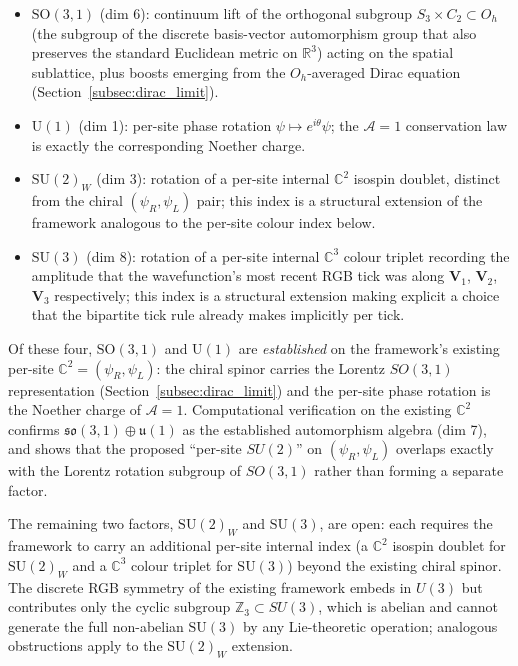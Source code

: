\begin{itemize}
\item $\mathrm{SO}(3,1)$ (dim 6): continuum lift of the orthogonal
subgroup $S_3 \times C_2 \subset O_h$ (the subgroup of the discrete
basis-vector automorphism group that also preserves the standard
Euclidean metric on $\mathbb{R}^3$) acting on the spatial sublattice,
plus boosts emerging from the $O_h$-averaged Dirac equation
(Section~\ref{subsec:dirac_limit}).
\item $\mathrm{U}(1)$ (dim 1): per-site phase rotation $\psi \mapsto
e^{i\theta}\psi$; the $\mathcal{A}=1$ conservation law is exactly the
corresponding Noether charge.
\item $\mathrm{SU}(2)_W$ (dim 3): rotation of a per-site internal
$\mathbb{C}^2$ isospin doublet, distinct from the chiral $(\psi_R,
\psi_L)$ pair; this index is a structural extension of the framework
analogous to the per-site colour index below.
\item $\mathrm{SU}(3)$ (dim 8): rotation of a per-site internal
$\mathbb{C}^3$ colour triplet recording the amplitude that the
wavefunction's most recent RGB tick was along $\mathbf{V}_1$,
$\mathbf{V}_2$, $\mathbf{V}_3$ respectively; this index is a
structural extension making explicit a choice that the bipartite
tick rule already makes implicitly per tick.
\end{itemize}

Of these four, $\mathrm{SO}(3,1)$ and $\mathrm{U}(1)$ are
\emph{established} on the framework's existing per-site
$\mathbb{C}^2 = (\psi_R, \psi_L)$: the chiral spinor carries the
Lorentz $SO(3,1)$ representation (Section~\ref{subsec:dirac_limit})
and the per-site phase rotation is the Noether charge of
$\mathcal{A}=1$.  Computational verification on the existing
$\mathbb{C}^2$ confirms $\mathfrak{so}(3,1) \oplus \mathfrak{u}(1)$
as the established automorphism algebra (dim 7), and shows that the
proposed ``per-site $SU(2)$'' on $(\psi_R, \psi_L)$ overlaps
exactly with the Lorentz rotation subgroup of $SO(3,1)$ rather than
forming a separate factor.

The remaining two factors, $\mathrm{SU}(2)_W$ and $\mathrm{SU}(3)$,
are open: each requires the framework to carry an additional per-site
internal index (a $\mathbb{C}^2$ isospin doublet for $\mathrm{SU}(2)_W$
and a $\mathbb{C}^3$ colour triplet for $\mathrm{SU}(3)$) beyond
the existing chiral spinor.  The discrete RGB symmetry of the
existing framework embeds in $U(3)$ but contributes only the cyclic
subgroup $\mathbb{Z}_3 \subset SU(3)$, which is abelian and cannot
generate the full non-abelian $\mathrm{SU}(3)$ by any Lie-theoretic
operation; analogous obstructions apply to the $\mathrm{SU}(2)_W$
extension.


